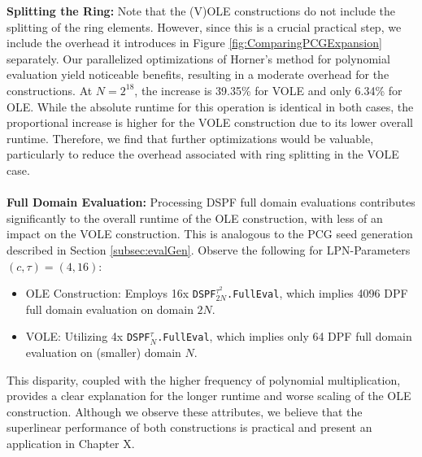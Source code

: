 \textbf{Splitting the Ring:} Note that the (V)OLE constructions do not include the splitting of the ring elements. However, since this is a crucial practical step, we include the overhead it introduces in Figure \ref{fig:ComparingPCGExpansion} separately. Our parallelized optimizations of Horner's method for polynomial evaluation yield noticeable benefits, resulting in a moderate overhead for the constructions. At $N=2^{18}$, the increase is 39.35\% for VOLE and only 6.34\% for OLE. While the absolute runtime for this operation is identical in both cases, the proportional increase is higher for the VOLE construction due to its lower overall runtime. Therefore, we find that further optimizations would be valuable, particularly to reduce the overhead associated with ring splitting in the VOLE case.
\\\\
\textbf{Full Domain Evaluation:} Processing DSPF full domain evaluations contributes significantly to the overall runtime of the OLE construction, with less of an impact on the VOLE construction. This is analogous to the PCG seed generation described in Section \ref{subsec:evalGen}. Observe the following for LPN-Parameters $(c,\tau)=(4,16)$:
\begin{itemize}
\item OLE Construction: Employs 16x \texttt{DSPF$^{\tau^2}_{2N}$.FullEval}, which implies 4096 DPF full domain evaluation on domain $2N$.
\item VOLE: Utilizing 4x \texttt{DSPF$^{\tau}_{N}$.FullEval}, which implies only 64 DPF full domain evaluation on (smaller) domain $N$.
\end{itemize}
This disparity, coupled with the higher frequency of polynomial multiplication, provides a clear explanation for the longer runtime and worse scaling of the OLE construction. Although we observe these attributes, we believe that the superlinear performance of both constructions is practical and present an application in Chapter X.
\\\\
